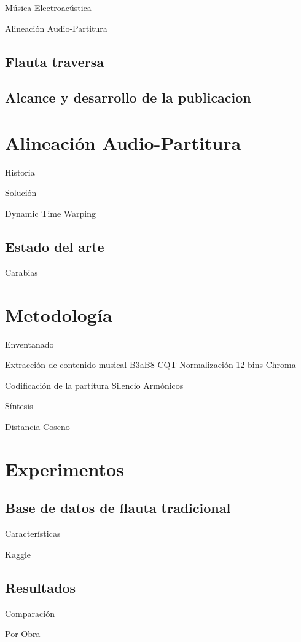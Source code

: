 \documentclass
  [ams,pdfout]%
	{aeslac}
\begin{document}
Música Electroacústica

Alineación Audio-Partitura

%
\subsection{Flauta traversa}

 


\subsection{Alcance y desarrollo de la publicacion}
%
\section{Alineación Audio-Partitura}
Historia

Solución

Dynamic Time Warping

\subsection{Estado del arte}
Carabias

\section{Metodología}
Enventanado

Extracción de contenido musical
	B3aB8 CQT
	Normalización
	12 bins Chroma

Codificación de la partitura
	Silencio
	Armónicos

Síntesis

Distancia Coseno


\section{Experimentos}

\subsection{Base de datos de flauta tradicional}


Características

Kaggle

\subsection{Resultados}
Comparación

Por Obra
\end{document}
